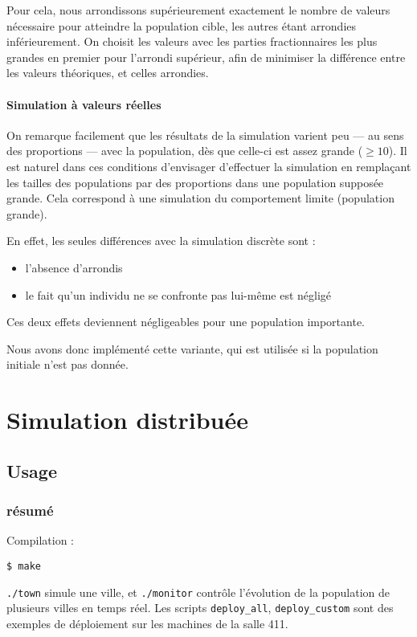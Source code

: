 \documentclass[10pt]{article}
\begin{document}
Pour cela, nous arrondissons supérieurement exactement le nombre de valeurs nécessaire pour atteindre
la population cible, les autres étant arrondies inférieurement. 
On choisit les valeurs avec les parties fractionnaires les plus grandes en premier pour l'arrondi supérieur,
afin de minimiser la différence entre les valeurs théoriques, et celles arrondies.

\paragraph{Simulation à valeurs réelles}
On remarque facilement que les résultats de la simulation varient peu --- au sens des proportions --- avec la population, dès que celle-ci
est assez grande ($\ge 10$).
Il est naturel dans ces conditions d'envisager d'effectuer la simulation en remplaçant les tailles des populations
par des proportions dans une population supposée grande. Cela correspond à une simulation du comportement limite (population grande).

En effet, les seules différences avec la simulation discrète sont :
\begin{itemize}
\item l'absence d'arrondis
\item le fait qu'un individu ne se confronte pas lui-même est négligé
\end{itemize}
Ces deux effets deviennent négligeables pour une population importante.

Nous avons donc implémenté cette variante, qui est utilisée si la population initiale n'est pas donnée.

\clearpage
\section{Simulation distribuée}
\subsection{Usage}
\subsubsection*{résumé}
Compilation :
\begin{verbatim}
$ make
\end{verbatim}

\verb|./town| simule une ville, et \verb|./monitor| contrôle l'évolution de la population de plusieurs villes en temps réel.
Les scripts \verb|deploy_all|, \verb|deploy_custom| sont des exemples de déploiement sur les machines de la salle 411.
\end{document}
